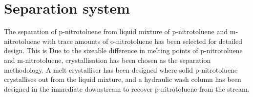 \section*{Separation system}

The separation of p-nitrotoluene from liquid mixture of p-nitrotoluene and m-nitrotoluene with trace amounts of o-nitrotoluene has been selected for detailed design. This is  Due to the sizeable difference in melting points of p-nitrotoluene and m-nitrotoluene, crystallisation has been chosen as the separation methodology. A melt crystalliser has been designed where solid p-nitrotoluene crystallises out from the liquid mixture, and a hydraulic wash column has been designed in the immediate downstream to recover p-nitrotoluene from the stream. 